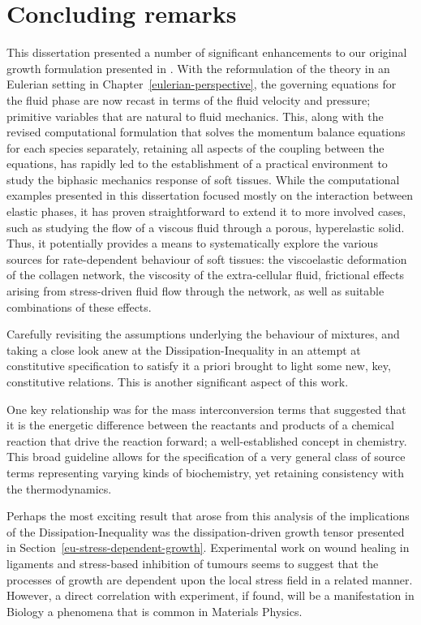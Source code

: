 \chapter{Concluding remarks}
\label{conclusions}

This dissertation presented a number of significant enhancements to
our original growth formulation presented in \citet{growthpaper}.
With the reformulation of the theory in an Eulerian setting in
Chapter~\ref{eulerian-perspective}, the governing equations for the
fluid phase are now recast in terms of the fluid velocity and
pressure; primitive variables that are natural to fluid
mechanics. This, along with the revised computational formulation that
solves the momentum balance equations for each species separately,
retaining all aspects of the coupling between the equations, has
rapidly led to the establishment of a practical environment to study
the biphasic mechanics response of soft tissues. While the
computational examples presented in this dissertation focused mostly
on the interaction between elastic phases, it has proven
straightforward to extend it to more involved cases, such as studying
the flow of a viscous fluid through a porous, hyperelastic
solid. Thus, it potentially provides a means to systematically explore
the various sources for rate-dependent behaviour of soft tissues: the
viscoelastic deformation of the collagen network, the viscosity of the
extra-cellular fluid, frictional effects arising from stress-driven
fluid flow through the network, as well as suitable combinations of
these effects.

Carefully revisiting the assumptions underlying the behaviour of
mixtures, and taking a close look anew at the Dissipation-Inequality
in an attempt at constitutive specification to satisfy it a priori
brought to light some new, key, constitutive relations. This is
another significant aspect of this work.

One key relationship was for the mass interconversion terms that
suggested that it is the energetic difference between the reactants
and products of a chemical reaction that drive the reaction forward; a
well-established concept in chemistry. This broad guideline allows for
the specification of a very general class of source terms representing
varying kinds of biochemistry, yet retaining consistency with the
thermodynamics.

Perhaps the most exciting result that arose from this analysis of the
implications of the Dissipation-Inequality was the dissipation-driven
growth tensor presented in
Section~\ref{eu-stress-dependent-growth}. Experimental work on wound
healing in ligaments \citep{Provenzanoetal:2003} and stress-based
inhibition of tumours \citep{jain1997} seems to suggest that the
processes of growth are dependent upon the local stress field in a
related manner. However, a direct correlation with experiment, if
found, will be a manifestation in Biology a phenomena that is common
in Materials Physics.

%

